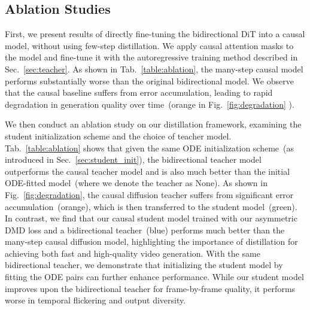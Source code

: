 \subsection{Ablation Studies}
\label{sec:ablation}
First, we present results of directly fine-tuning the bidirectional DiT into a causal model, without using few-step distillation. We apply causal attention masks to the model and fine-tune it with the autoregressive training method described in Sec.~\ref{sec:teacher}.
As shown in Tab.~\ref{table:ablation}, the many-step causal model performs substantially worse than the original bidirectional model. 
We observe that the causal baseline suffers from error accumulation, leading to rapid degradation in generation quality over time~(\textcolor{myorange}{orange} in Fig.~\ref{fig:degradation} ).

We then conduct an ablation study on our distillation framework, examining the student initialization scheme and the choice of teacher model. Tab.~\ref{table:ablation} shows that given the same ODE initialization scheme~(as introduced in Sec.~\ref{sec:student_init}), the bidirectional teacher model outperforms the causal teacher model and is also much better than the initial ODE-fitted model~(where we denote the teacher as None). 
As shown in Fig.~\ref{fig:degradation}, the causal diffusion teacher suffers from significant error accumulation~(\textcolor{myorange}{orange}), which is then transferred to the student model~(\textcolor{mygreen}{green}). 
In contrast, we find that our causal student model trained with our asymmetric DMD loss and a bidirectional teacher~(\textcolor{myblue}{blue}) performs much better than the many-step causal diffusion model, highlighting the importance of distillation for achieving both fast and high-quality video generation. With the same bidirectional teacher, we demonstrate that initializing the student model by fitting the ODE pairs can further enhance performance.
While our student model improves upon the bidirectional teacher for frame-by-frame quality, it performs worse in temporal flickering and output diversity.





